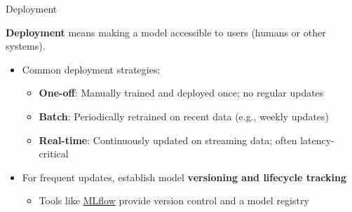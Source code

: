 \documentclass[10pt,compress,t,notes=noshow, xcolor=table]{beamer}
\begin{document}


\begin{frame}{Deployment}
\label{deployment}

\textbf{Deployment} means making a model accessible to users (humans or other systems).

\vspace{0.5em}
\begin{itemize}
  \item Common deployment strategies:
    \begin{itemize}
      \item \textbf{One-off}: Manually trained and deployed once; no regular updates
      \item \textbf{Batch}: Periodically retrained on recent data (e.g., weekly updates)
      \item \textbf{Real-time}: Continuously updated on streaming data; often latency-critical
    \end{itemize}
  \item For frequent updates, establish model \textbf{versioning and lifecycle tracking}
    \begin{itemize}
      \item Tools like \href{https://mlflow.org/}{MLflow} provide version control and a model registry
    \end{itemize}
\end{itemize}
\end{frame}
\end{document}
